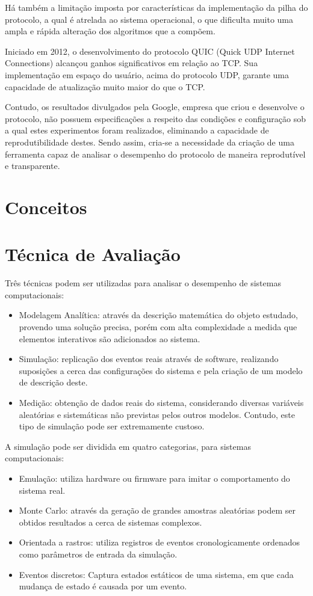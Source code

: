 \documentclass{article}
\begin{document}
Há também a limitação imposta por características da implementação da pilha do protocolo, a qual é atrelada ao sistema
operacional, o que dificulta muito uma ampla e rápida alteração dos algoritmos que a compõem.

Iniciado em 2012, o desenvolvimento do protocolo QUIC (Quick UDP Internet Connections) alcançou ganhos significativos em
relação ao TCP. Sua implementação em espaço do usuário, acima do protocolo UDP, garante uma capacidade de atualização
muito maior do que o TCP.

Contudo, os resultados divulgados pela Google, empresa que criou e desenvolve o protocolo, não possuem especificações a
respeito das condições e configuração sob a qual estes experimentos foram realizados, eliminando a capacidade de
reprodutibilidade destes. Sendo assim, cria-se a necessidade da criação de uma ferramenta capaz de analisar o desempenho
do protocolo de maneira reprodutível e transparente.

\section{Conceitos}
\section{Técnica de Avaliação}
Três técnicas podem ser utilizadas para analisar o desempenho de sistemas computacionais:

\begin{itemize}
\item Modelagem Analítica: através da descrição matemática do objeto estudado, provendo uma solução precisa, porém com
alta complexidade a medida que elementos interativos são adicionados ao sistema.
\item Simulação: replicação dos eventos reais através de software, realizando suposições a cerca das configurações do
sistema e pela criação de um modelo de descrição deste.
\item Medição: obtenção de dados reais do sistema, considerando diversas variáveis aleatórias e sistemáticas não
previstas pelos outros modelos. Contudo, este tipo de simulação pode ser extremamente custoso.
\end{itemize}

A simulação pode ser dividida em quatro categorias, para sistemas computacionais:
\begin{itemize}
\item Emulação: utiliza hardware ou firmware para imitar o comportamento do sistema real.
\item Monte Carlo: através da geração de grandes amostras aleatórias podem ser obtidos resultados a cerca de sistemas
complexos.
\item Orientada a rastros: utiliza registros de eventos cronologicamente ordenados como parâmetros de entrada da
simulação.
\item Eventos discretos: Captura estados estáticos de uma sistema, em que cada mudança de estado é causada por um
evento.
\end{itemize}
\end{document}
